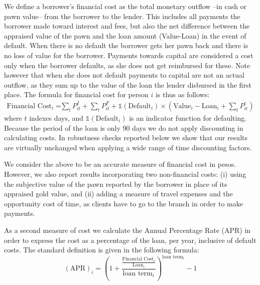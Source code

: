 \documentclass[12pt, a4paper]{article}
\begin{document}
We define a borrower's financial cost as the total monetary outflow --in cash or pawn value-- from the borrower to the lender. This includes all payments the borrower made toward interest and fees, but also the net difference between the appraised value of the pawn and the loan amount (Value-Loan) in the event of default. When there is no default the borrower gets her pawn back and there is no loss of value for the borrower. Payments towards capital are considered a cost only when the borrower defaults, as she does not get reimbursed for these. Note however that when she does not default payments to capital are not an actual outflow, as they sum up to the value of the loan the lender disbursed in the first place. The formula for financial cost for person $i$ is thus as follows: %
\begin{align*}
    \text{Financial Cost}_i =&  \sum_t P^I_{it} +\sum_t P^F_{it}  
     + \mathds{1}(\text{Default}_i) \times \left(\text{Value}_i-\text{Loan}_i + \sum_t P^c_{it}\right)
\end{align*}
where $t$ indexes days, and $\mathds{1}(\text{Default}_i)$ is an indicator function for defaulting. Because the period of the loan is only 90 days we do not apply discounting in calculating costs.  In robustness checks reported below we show that our results are virtually unchanged when applying a wide range of time discounting factors.

We consider the above to be an accurate measure of financial cost in pesos. However, we also report results incorporating two non-financial costs: (i) using the subjective value of the pawn reported by the borrower in place of its appraised gold value, and (ii) adding a measure of travel expenses and the opportunity cost of time, as clients have to go to the branch in order to make payments.

As a second measure of cost we calculate the Annual Percentage Rate (APR) in order to express the cost as a percentage of the loan, per year, inclusive of default costs. The standard definition is given in the following formula: 
$$(\text{APR})_i =\left( 1 + \frac{\frac{\text{Financial Cost}_i}{\text{Loan}_i}}{\text{loan term}_i}\right)^{\text{loan term}_i}-1 $$



\end{document}
